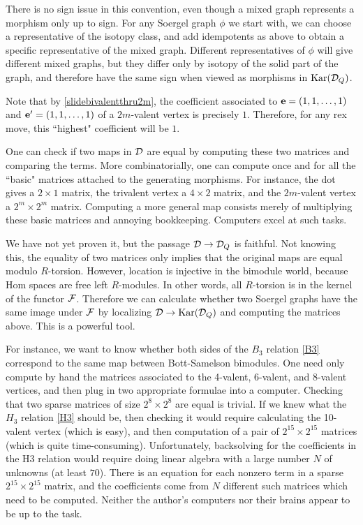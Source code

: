 
There is no sign issue in this convention, even though a mixed graph represents a morphism only up to sign. For any Soergel graph $\phi$ we start with, we can choose a representative of
the isotopy class, and add idempotents as above to obtain a specific representative of the mixed graph. Different representatives of $\phi$ will give different mixed graphs, but they
differ only by isotopy of the solid part of the graph, and therefore have the same sign when viewed as morphisms in $\textrm{Kar}({\mathcal{D}}_Q)$.

Note that by \eqref{slidebivalentthru2m}, the coefficient associated to ${\mathbf e}=(1,1,\ldots,1)$ and ${\mathbf e}' = (1,1,\ldots,1)$ of a $2m$-valent vertex is precisely $1$. Therefore, for any rex
move, this ``highest" coefficient will be $1$.

One can check if two maps in ${\mathcal{D}}$ are equal by computing these two matrices and comparing the terms. More combinatorially, one can compute once and for all the ``basic" matrices
attached to the generating morphisms. For instance, the dot gives a $2 \times 1$ matrix, the trivalent vertex a $4 \times 2$ matrix, and the $2m$-valent vertex a $2^m \times 2^m$ matrix.
Computing a more general map consists merely of multiplying these basic matrices and annoying bookkeeping. Computers excel at such tasks.

We have not yet proven it, but the passage ${\mathcal{D}} \rightarrow {\mathcal{D}}_Q$ is faithful. Not knowing this, the equality of two matrices only implies that the original maps are equal modulo $R$-torsion.
However, location is injective in the bimodule world, because Hom spaces are free left $R$-modules. In other words, all $R$-torsion is in the kernel of the functor ${\mathcal{F}}$. Therefore we can
calculate whether two Soergel graphs have the same image under ${\mathcal{F}}$ by localizing ${\mathcal{D}} \rightarrow \textrm{Kar}({\mathcal{D}}_Q)$ and computing the matrices above. This is a powerful tool.

For instance, we want to know whether both sides of the $B_3$ relation \eqref{B3} correspond to the same map between Bott-Samelson bimodules. One need only compute by hand the matrices
associated to the 4-valent, 6-valent, and 8-valent vertices, and then plug in two appropriate formulae into a computer. Checking that two sparse matrices of size $2^8 \times 2^8$ are equal
is trivial. If we knew what the $H_3$ relation \eqref{H3} should be, then checking it would require calculating the 10-valent vertex (which is easy), and then computation of a pair of
$2^{15} \times 2^{15}$ matrices (which is quite time-consuming). Unfortunately, backsolving for the coefficients in the H3 relation would require doing linear algebra with a large number
$N$ of unknowns (at least $70$). There is an equation for each nonzero term in a sparse $2^{15} \times 2^{15}$ matrix, and the coefficients come from $N$ different such matrices which need
to be computed. Neither the author's computers nor their brains appear to be up to the task.

